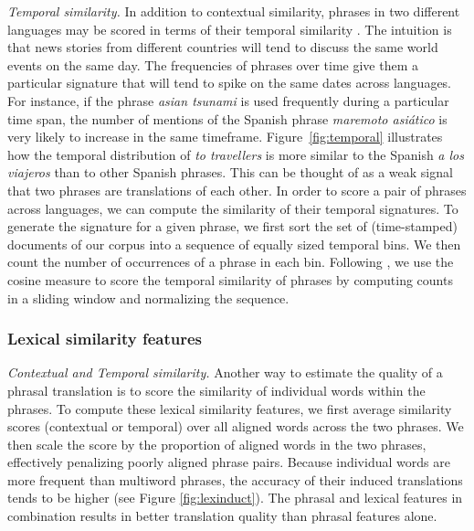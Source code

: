 \documentclass[11pt]{article}
\newcommand{\mtodo}[1]{}
\newcommand{\figref}[1]{Figure~\ref{#1}}
\newcommand{\paraheader}[1]{\vskip 0.05in \noindent\emph{#1}}
\begin{document}
\paraheader{Temporal similarity.} In addition to contextual similarity, phrases in two different languages may be scored in terms of their temporal similarity \cite{alfonseca-ciaramita-hall:2009:EMNLP}.  The intuition is that news stories from different countries will tend to discuss the same world events on the same day.  The frequencies of phrases over time give them a particular signature that will tend to spike on the same dates across languages.  For instance, if the phrase {\it asian tsunami} is used frequently during a particular time span, the number of mentions of the Spanish phrase {\it maremoto asi\'{a}tico} is very likely to increase in the same timeframe. \figref{fig:temporal} illustrates how the temporal distribution of {\it to travellers} is more similar to the Spanish {\it a los viajeros} than to other Spanish phrases.  This can be thought of as a weak signal that two phrases are translations of each other.  In order to score a pair of phrases across languages, we can compute the similarity of their temporal signatures. To generate the signature for a given phrase, we first sort the set of (time-stamped) documents of our corpus into a sequence of equally sized temporal bins.  We then count the number of occurrences of a phrase in each bin.  Following , we use the cosine measure to score the temporal similarity of phrases by computing counts in a sliding window and normalizing the sequence.




\subsubsection{Lexical similarity features}  \label{sect:lexfeats}

\paraheader{Contextual and Temporal similarity.}  Another way to estimate the quality of a phrasal translation is to score the similarity of individual words within the phrases.  To compute these lexical similarity features, we first average similarity scores (contextual or temporal) over all aligned words across the two phrases.  We then scale the score by the proportion of aligned words in the two phrases, effectively penalizing poorly aligned phrase pairs. Because individual words are more frequent than multiword phrases, the accuracy of their induced translations tends to be higher (see Figure \ref{fig:lexinduct}). The phrasal and lexical features in combination results in better translation quality than phrasal features alone. \mtodo{Mention that it is the average of both forward and backward alignments?}
\end{document}
